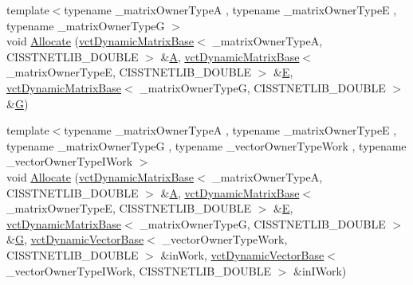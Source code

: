 \begin{DoxyCompactItemize}
\item 
{\footnotesize template$<$typename \-\_\-matrix\-Owner\-Type\-A , typename \-\_\-matrix\-Owner\-Type\-E , typename \-\_\-matrix\-Owner\-Type\-G $>$ }\\void \hyperlink{classnmr_l_sq_lin_solution_dynamic_a91b81a354d2cc9d11314b0ab079bad59}{Allocate} (\hyperlink{classvct_dynamic_matrix_base}{vct\-Dynamic\-Matrix\-Base}$<$ \-\_\-matrix\-Owner\-Type\-A, C\-I\-S\-S\-T\-N\-E\-T\-L\-I\-B\-\_\-\-D\-O\-U\-B\-L\-E $>$ \&\hyperlink{classnmr_l_sq_lin_solution_dynamic_aa4a41abac141e2e55dd5cafb59169dfd}{A}, \hyperlink{classvct_dynamic_matrix_base}{vct\-Dynamic\-Matrix\-Base}$<$ \-\_\-matrix\-Owner\-Type\-E, C\-I\-S\-S\-T\-N\-E\-T\-L\-I\-B\-\_\-\-D\-O\-U\-B\-L\-E $>$ \&\hyperlink{classnmr_l_sq_lin_solution_dynamic_a7c1ac112b07f3edd33d348fe0a40fb71}{E}, \hyperlink{classvct_dynamic_matrix_base}{vct\-Dynamic\-Matrix\-Base}$<$ \-\_\-matrix\-Owner\-Type\-G, C\-I\-S\-S\-T\-N\-E\-T\-L\-I\-B\-\_\-\-D\-O\-U\-B\-L\-E $>$ \&\hyperlink{classnmr_l_sq_lin_solution_dynamic_a399cb314fb848d36f58c14830bad0c28}{G})
\item 
{\footnotesize template$<$typename \-\_\-matrix\-Owner\-Type\-A , typename \-\_\-matrix\-Owner\-Type\-E , typename \-\_\-matrix\-Owner\-Type\-G , typename \-\_\-vector\-Owner\-Type\-Work , typename \-\_\-vector\-Owner\-Type\-I\-Work $>$ }\\void \hyperlink{classnmr_l_sq_lin_solution_dynamic_a32ea606d33b601d46cb99c53c55c3f27}{Allocate} (\hyperlink{classvct_dynamic_matrix_base}{vct\-Dynamic\-Matrix\-Base}$<$ \-\_\-matrix\-Owner\-Type\-A, C\-I\-S\-S\-T\-N\-E\-T\-L\-I\-B\-\_\-\-D\-O\-U\-B\-L\-E $>$ \&\hyperlink{classnmr_l_sq_lin_solution_dynamic_aa4a41abac141e2e55dd5cafb59169dfd}{A}, \hyperlink{classvct_dynamic_matrix_base}{vct\-Dynamic\-Matrix\-Base}$<$ \-\_\-matrix\-Owner\-Type\-E, C\-I\-S\-S\-T\-N\-E\-T\-L\-I\-B\-\_\-\-D\-O\-U\-B\-L\-E $>$ \&\hyperlink{classnmr_l_sq_lin_solution_dynamic_a7c1ac112b07f3edd33d348fe0a40fb71}{E}, \hyperlink{classvct_dynamic_matrix_base}{vct\-Dynamic\-Matrix\-Base}$<$ \-\_\-matrix\-Owner\-Type\-G, C\-I\-S\-S\-T\-N\-E\-T\-L\-I\-B\-\_\-\-D\-O\-U\-B\-L\-E $>$ \&\hyperlink{classnmr_l_sq_lin_solution_dynamic_a399cb314fb848d36f58c14830bad0c28}{G}, \hyperlink{classvct_dynamic_vector_base}{vct\-Dynamic\-Vector\-Base}$<$ \-\_\-vector\-Owner\-Type\-Work, C\-I\-S\-S\-T\-N\-E\-T\-L\-I\-B\-\_\-\-D\-O\-U\-B\-L\-E $>$ \&in\-Work, \hyperlink{classvct_dynamic_vector_base}{vct\-Dynamic\-Vector\-Base}$<$ \-\_\-vector\-Owner\-Type\-I\-Work, C\-I\-S\-S\-T\-N\-E\-T\-L\-I\-B\-\_\-\-D\-O\-U\-B\-L\-E $>$ \&in\-I\-Work)

\end{DoxyCompactItemize}
